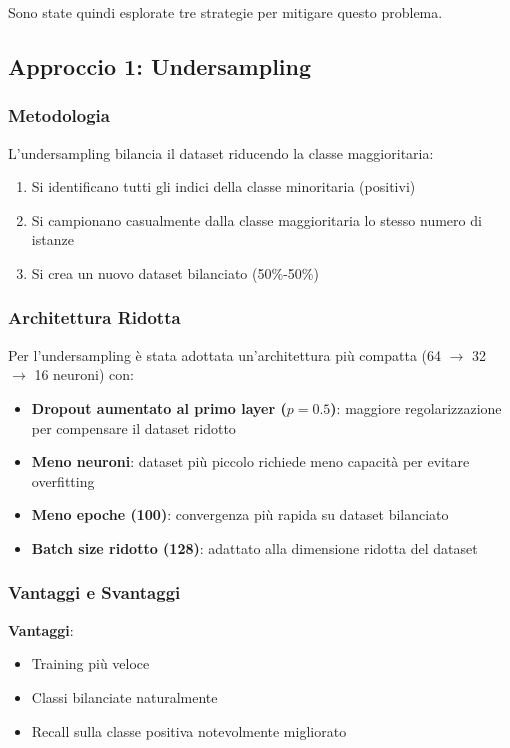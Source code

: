 Sono state quindi esplorate tre strategie per mitigare questo problema.

\subsection{Approccio 1: Undersampling}

\subsubsection{Metodologia}

L'undersampling bilancia il dataset riducendo la classe maggioritaria:
\begin{enumerate}
    \item Si identificano tutti gli indici della classe minoritaria (positivi)
    \item Si campionano casualmente dalla classe maggioritaria lo stesso numero di istanze
    \item Si crea un nuovo dataset bilanciato (50\%-50\%)
\end{enumerate}

\subsubsection{Architettura Ridotta}

Per l'undersampling è stata adottata un'architettura più compatta (64 $\rightarrow$ 32 $\rightarrow$ 16 neuroni) con:
\begin{itemize}
    \item \textbf{Dropout aumentato al primo layer ($p = 0.5$)}: maggiore regolarizzazione per compensare il dataset ridotto
    \item \textbf{Meno neuroni}: dataset più piccolo richiede meno capacità per evitare overfitting
    \item \textbf{Meno epoche (100)}: convergenza più rapida su dataset bilanciato
    \item \textbf{Batch size ridotto (128)}: adattato alla dimensione ridotta del dataset
\end{itemize}

\subsubsection{Vantaggi e Svantaggi}

\textbf{Vantaggi}:
\begin{itemize}
    \item Training più veloce
    \item Classi bilanciate naturalmente
    \item Recall sulla classe positiva notevolmente migliorato
\end{itemize}

